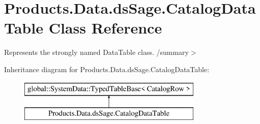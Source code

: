 \hypertarget{class_products_1_1_data_1_1ds_sage_1_1_catalog_data_table}{}\section{Products.\+Data.\+ds\+Sage.\+Catalog\+Data\+Table Class Reference}
\label{class_products_1_1_data_1_1ds_sage_1_1_catalog_data_table}


Represents the strongly named Data\+Table class. /summary$>$  


Inheritance diagram for Products.\+Data.\+ds\+Sage.\+Catalog\+Data\+Table\+:\begin{figure}[H]
\begin{center}
\leavevmode
\includegraphics[height=2.000000cm]{class_products_1_1_data_1_1ds_sage_1_1_catalog_data_table}
\end{center}
\end{figure}
